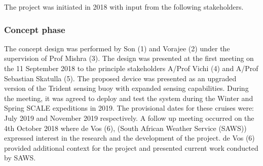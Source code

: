 The project was initiated in 2018 with input from the following stakeholders.
\begin{table}[H]
    \centering
    \caption{Legend showing the key stakeholders in the initiation of the project as discussed in the phases below. Legend includes name, reference number and department/institution. }
    \label{tab:proj_init_members}

\end{table}

\subsubsection{Concept phase}

The concept design was performed by Son (1) and Vorajee (2) under the supervision of Prof Mishra (3). The design was presented at the first meeting on the 11 September 2018 to the principle stakeholders A/Prof Vichi (4) and A/Prof Sebastian Skatulla (5). The proposed device was presented as an upgraded version of the Trident sensing buoy with expanded sensing capabilities. During the meeting, it was agreed to deploy and test the system during the Winter and Spring SCALE expeditions in 2019. The provisional dates for these cruises were: July 2019 and November 2019 respectively. A follow up meeting occurred on the 4th October 2018 where de Vos (6), (South African Weather Service (SAWS)) expressed interest in the research and the development of the project. de Vos (6) provided additional context for the project and presented current work conducted by SAWS.

